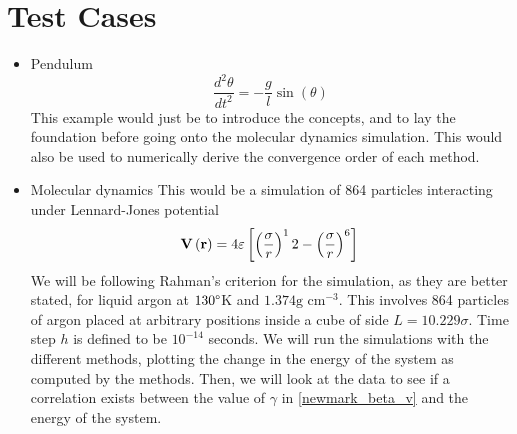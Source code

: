 \documentclass[a4paper, 12pt]{article}
\renewcommand{\vec}[1]{\mathbf{#1}}
\begin{document}
	\section{Test Cases}
\begin{itemize}
	\item Pendulum
$$
\frac{d^2\theta}{dt^2} = -\frac{g}{l}\sin(\theta)
$$
This example would just be to introduce the concepts, and to lay the foundation before going onto the molecular dynamics simulation. This would also be used to numerically derive the convergence order of each method.
	\item Molecular dynamics
This would be a simulation of 864 particles interacting under Lennard-Jones potential
$$
\vec{V}\left(\vec{r}\right) = 4\varepsilon \left[ \left( \frac{\sigma}{r}\right)^12 - \left( \frac{\sigma}{r}\right)^6 \right] \\
$$
We will be following Rahman's \cite{Rahman1964} criterion for the simulation, as they are better stated, for liquid argon at $130\degree $K  and $1.374 \mbox{g cm}^{-3}$.  This involves 864 particles of argon placed at arbitrary positions inside a cube of side $ L = 10.229\sigma$. Time step $h$ is defined to be $10^{-14}$ seconds. We will run the simulations with the different methods, plotting the change in the energy of the system as computed by the methods. Then, we will look at the data to see if a correlation exists between the value of $\gamma$ in \eqref{newmark_beta_v} and the energy of the system.
\end{itemize}
\end{document}
